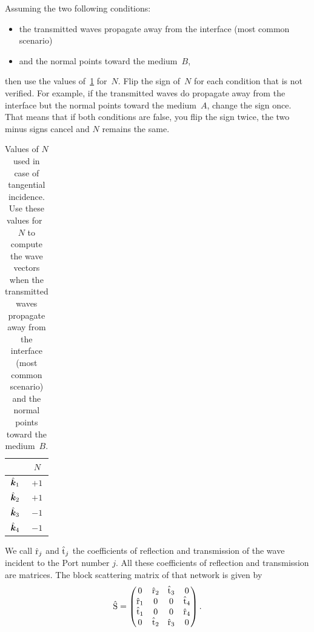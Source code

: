 Assuming the two following conditions:
\begin{itemize}
    \item the transmitted waves propagate away from the interface (most common scenario)
    \item and the normal points toward the medium~$B$,
\end{itemize}
then use the values of~\cref{tab:fresnel_implementation_N} for~$N$.
Flip the sign of~$N$ for each condition that is not verified.
For example, if the transmitted waves do propagate away from the interface but the normal points toward the medium~$A$, change the sign once.
That means that if both conditions are false, you flip the sign twice, the two minus signs cancel and $N$ remains the same.

\begin{table}
    \centering
    \begin{tabular}{cc}
        \toprule
                       & $N$  \\
        \midrule
        $\hat{\bm{k}}_1$ & $+1$ \\
        $\hat{\bm{k}}_2$ & $+1$ \\
        $\hat{\bm{k}}_3$ & $-1$ \\
        $\hat{\bm{k}}_4$ & $-1$ \\
        \bottomrule
    \end{tabular}
    \caption{
        Values of $N$ used in case of tangential incidence.
        Use these values for~$N$ to compute the wave vectors when
        the transmitted waves propagate away from the interface (most common scenario)
        and the normal points toward the medium~$B$.
    }
    \label{tab:fresnel_implementation_N}
\end{table}

\begin{samepage}
We call $\hat{\mathrm{r}}_j$ and $\hat{\mathrm{t}}_j$ the coefficients of reflection and transmission of the wave incident to the Port number $j$.
All these coefficients of reflection and transmission are matrices.
The block scattering matrix of that network is given by
\begin{equation}
    \hat{\mathrm{S}} =
    \begin{pmatrix}
        0            & \hat{\mathrm{r}}_2 & \hat{\mathrm{t}}_3 & 0            \\
        \hat{\mathrm{r}}_1 & 0            & 0            & \hat{\mathrm{t}}_4 \\
        \hat{\mathrm{t}}_1 & 0            & 0            & \hat{\mathrm{r}}_4 \\
        0            & \hat{\mathrm{t}}_2 & \hat{\mathrm{r}}_3 & 0            \\
    \end{pmatrix}
    \text{.}
\end{equation}
\end{samepage}


